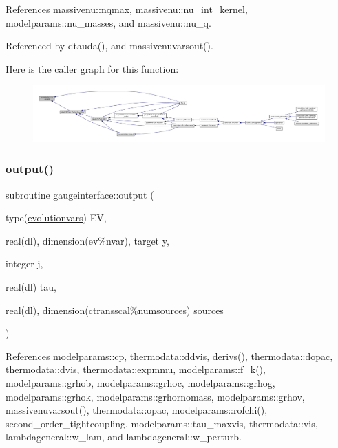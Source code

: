 References massivenu\+::nqmax, massivenu\+::nu\+\_\+int\+\_\+kernel, modelparams\+::nu\+\_\+masses, and massivenu\+::nu\+\_\+q.



Referenced by dtauda(), and massivenuvarsout().

Here is the caller graph for this function\+:
\nopagebreak
\begin{figure}[H]
\begin{center}
\leavevmode
\includegraphics[width=350pt]{namespacegaugeinterface_acba44d8f8f824999640418908be29b9b_icgraph}
\end{center}
\end{figure}
\mbox{\label{namespacegaugeinterface_ac370c67bc9750bf5749a69531fe3ffc1}} 
\subsubsection{\texorpdfstring{output()}{output()}}
{\footnotesize\ttfamily subroutine gaugeinterface\+::output (\begin{DoxyParamCaption}\item[{type(\mbox{\hyperlink{structgaugeinterface_1_1evolutionvars}{evolutionvars}})}]{EV,  }\item[{real(dl), dimension(ev\%nvar), target}]{y,  }\item[{integer}]{j,  }\item[{real(dl)}]{tau,  }\item[{real(dl), dimension(ctransscal\%numsources)}]{sources }\end{DoxyParamCaption})}



References modelparams\+::cp, thermodata\+::ddvis, derivs(), thermodata\+::dopac, thermodata\+::dvis, thermodata\+::expmmu, modelparams\+::f\+\_\+k(), modelparams\+::grhob, modelparams\+::grhoc, modelparams\+::grhog, modelparams\+::grhok, modelparams\+::grhornomass, modelparams\+::grhov, massivenuvarsout(), thermodata\+::opac, modelparams\+::rofchi(), second\+\_\+order\+\_\+tightcoupling, modelparams\+::tau\+\_\+maxvis, thermodata\+::vis, lambdageneral\+::w\+\_\+lam, and lambdageneral\+::w\+\_\+perturb.



